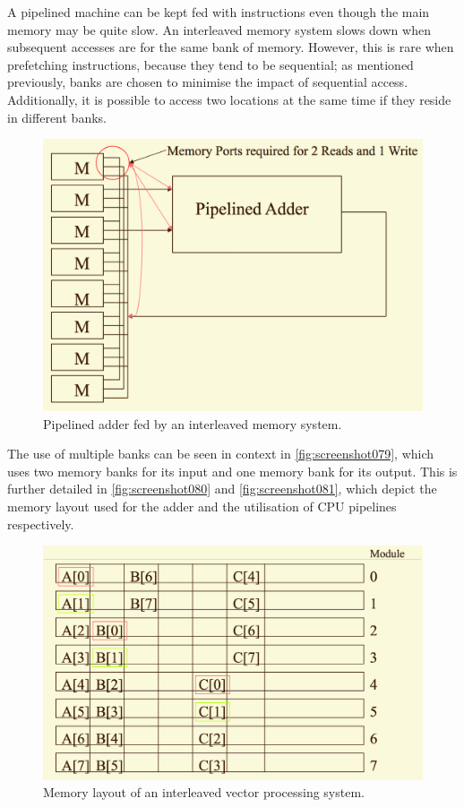 A pipelined machine can be kept fed with instructions even though the main memory may be quite slow. An interleaved memory system slows down when subsequent accesses are for the same bank of memory. However, this is rare when prefetching instructions, because they tend to be sequential; as mentioned previously, banks are chosen to minimise the impact of sequential access. Additionally, it is possible to access two locations at the same time if they reside in different banks.  

\begin{figure}
\centering
\includegraphics[width=0.7\linewidth]{figures/screenshot079}
\caption{Pipelined adder fed by an interleaved memory system.}
\label{fig:screenshot079}
\end{figure}

The use of multiple banks can be seen in context in \autoref{fig:screenshot079}, which uses two memory banks for its input and one memory bank for its output. This is further detailed in \autoref{fig:screenshot080} and \autoref{fig:screenshot081}, which depict the memory layout used for the adder and the utilisation of CPU pipelines respectively.

\begin{figure}
\centering
\includegraphics[width=0.7\linewidth]{figures/screenshot080}
\caption{Memory layout of an interleaved vector processing system.}
\label{fig:screenshot080}
\end{figure}

